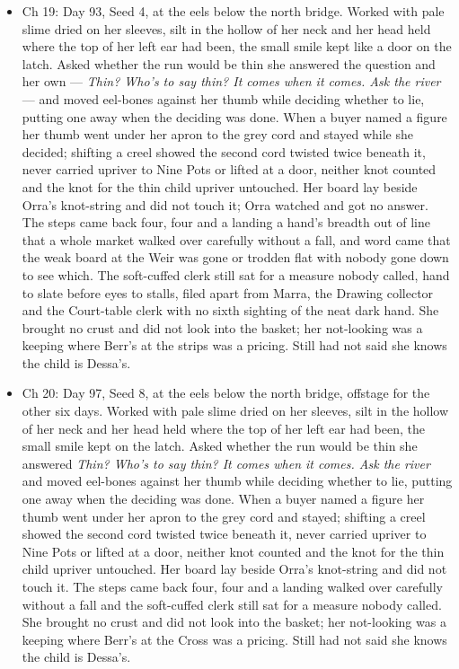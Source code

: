 \documentclass{design/chronicle}
\begin{document}
{\begin{itemize}[leftmargin=1.4em,itemsep=1pt,topsep=3pt,parsep=0pt]
\item Ch 19: Day 93, Seed 4, at the eels below the north bridge. Worked with pale slime dried on her sleeves, silt in the hollow of her neck and her head held where the top of her left ear had been, the small smile kept like a door on the latch. Asked whether the run would be thin she answered the question and her own --- \emph{Thin? Who’s to say thin? It comes when it comes. Ask the river} --- and moved eel-bones against her thumb while deciding whether to lie, putting one away when the deciding was done. When a buyer named a figure her thumb went under her apron to the grey cord and stayed while she decided; shifting a creel showed the second cord twisted twice beneath it, never carried upriver to Nine Pots or lifted at a door, neither knot counted and the knot for the thin child upriver untouched. Her board lay beside Orra’s knot-string and did not touch it; Orra watched and got no answer. The steps came back four, four and a landing a hand’s breadth out of line that a whole market walked over carefully without a fall, and word came that the weak board at the Weir was gone or trodden flat with nobody gone down to see which. The soft-cuffed clerk still sat for a measure nobody called, hand to slate before eyes to stalls, filed apart from Marra, the Drawing collector and the Court-table clerk with no sixth sighting of the neat dark hand. She brought no crust and did not look into the basket; her not-looking was a keeping where Berr’s at the strips was a pricing. Still had not said she knows the child is Dessa’s.

\end{itemize}

\begin{itemize}[leftmargin=1.4em,itemsep=1pt,topsep=3pt,parsep=0pt]

\item Ch 20: Day 97, Seed 8, at the eels below the north bridge, offstage for the other six days. Worked with pale slime dried on her sleeves, silt in the hollow of her neck and her head held where the top of her left ear had been, the small smile kept on the latch. Asked whether the run would be thin she answered \emph{Thin? Who’s to say thin? It comes when it comes. Ask the river} and moved eel-bones against her thumb while deciding whether to lie, putting one away when the deciding was done. When a buyer named a figure her thumb went under her apron to the grey cord and stayed; shifting a creel showed the second cord twisted twice beneath it, never carried upriver to Nine Pots or lifted at a door, neither knot counted and the knot for the thin child upriver untouched. Her board lay beside Orra’s knot-string and did not touch it. The steps came back four, four and a landing walked over carefully without a fall and the soft-cuffed clerk still sat for a measure nobody called. She brought no crust and did not look into the basket; her not-looking was a keeping where Berr’s at the Cross was a pricing. Still had not said she knows the child is Dessa’s.


\end{itemize}}
\end{document}

